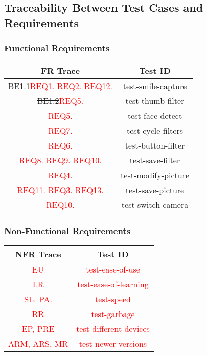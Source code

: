 \documentclass[12pt, titlepage]{article}
\begin{document}
\subsection{Traceability Between Test Cases and Requirements}

\subsubsection{Functional Requirements}

\begin{center}
\begin{tabular}{ |c|c| } 
 \hline
 FR Trace & Test ID \\ 
  \hline
   \hline
\sout{BE1.1}\textcolor{red}{REQ1. REQ2. REQ12.} & test-smile-capture \\ 
  \hline
\sout{BE1.2}\textcolor{red}{REQ5.} & test-thumb-filter \\ 
 \hline
 \textcolor{red}{REQ5.} & test-face-detect \\ 
 \hline
 \textcolor{red}{REQ7.} & test-cycle-filters \\ 
 \hline
 \textcolor{red}{REQ6.} & test-button-filter \\ 
 \hline
 \textcolor{red}{REQ8. REQ9. REQ10.} & test-save-filter \\ 
 \hline
 \textcolor{red}{REQ4.} & test-modify-picture \\ 
 \hline
 \textcolor{red}{REQ11. REQ3. REQ13.} & test-save-picture \\ 
 \hline
 \textcolor{red}{REQ10.} & test-switch-camera \\ 
 \hline
\end{tabular}
\end{center}

\subsubsection{Non-Functional Requirements}
\begin{center}
\begin{tabular}{ |c|c| } 
 \hline
 NFR Trace & Test ID \\ 
  \hline
   \hline
\textcolor{red}{EU} & \textcolor{red}{test-ease-of-use} \\ 
  \hline
\textcolor{red}{LR} & \textcolor{red}{test-ease-of-learning} \\ 
  \hline
\textcolor{red}{SL. PA.} & \textcolor{red}{test-speed} \\ 
  \hline
\textcolor{red}{RR} & \textcolor{red}{test-garbage} \\ 
  \hline
\textcolor{red}{EP, PRE} & \textcolor{red}{test-different-devices} \\ 
  \hline
\textcolor{red}{ARM, ARS, MR} & \textcolor{red}{test-newer-versions} \\ 
 \hline
\end{tabular}
\end{center}
\end{document}
